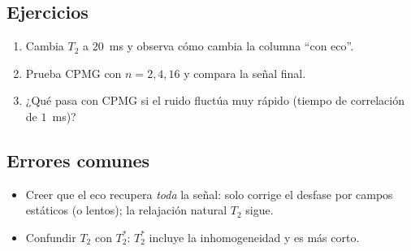 \subsection{Ejercicios}
\begin{enumerate}
  \item Cambia $T_2$ a $20$~ms y observa cómo cambia la columna ``con eco''.
  \item Prueba CPMG con $n=2,4,16$ y compara la señal final.
  \item ¿Qué pasa con CPMG si el ruido fluctúa muy rápido (tiempo de
    correlación de $1$~ms)?
\end{enumerate}

\subsection{Errores comunes}
\begin{itemize}
  \item Creer que el eco recupera \emph{toda} la señal: solo corrige el
    desfase por campos estáticos (o lentos); la relajación natural $T_2$ sigue.
  \item Confundir $T_2$ con $T_2^{*}$: $T_2^{*}$ incluye la inhomogeneidad y es
    más corto.
\end{itemize}


